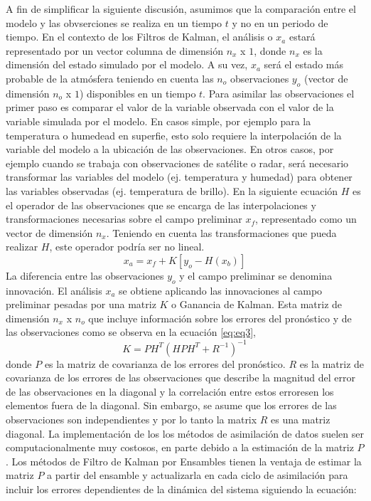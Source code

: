 \documentclass[12pt,oneside,a4paper]{reedthesis}
\begin{document}
A fin de simplificar la siguiente discusión, asumimos que la comparación entre el modelo y las obvserciones se realiza en un tiempo \(t\) y no en un periodo de tiempo. En el contexto de los Filtros de Kalman, el análisis o \(x_a\) estará representado por un vector columna de dimensión \(n_x\) x \(1\), donde \(n_x\) es la dimensión del estado simulado por el modelo. A su vez, \(x_a\) será el estado más probable de la atmósfera teniendo en cuenta las \(n_o\) observaciones \(y_o\) (vector de dimensión \(n_o\) x \(1\)) disponibles en un tiempo \(t\). Para asimilar las observaciones el primer paso es comparar el valor de la variable observada con el valor de la variable simulada por el modelo. En casos simple, por ejemplo para la temperatura o humedead en superfie, esto solo requiere la interpolación de la variable del modelo a la ubicación de las observaciones. En otros casos, por ejemplo cuando se trabaja con observaciones de satélite o radar, será necesario transformar las variables del modelo (ej. temperatura y humedad) para obtener las variables observadas (ej. temperatura de brillo). En la siguiente ecuación \(H\) es el operador de las observaciones que se encarga de las interpolaciones y transformaciones necesarias sobre el campo preliminar \(x_f\), representado como un vector de dimensión \(n_x\). Teniendo en cuenta las transformaciones que pueda realizar \(H\), este operador podría ser no lineal.
\begin{equation}
x_a = x_f + K[y_o - H(x_b )]
\label{eq:eq1}
\end{equation}
La diferencia entre las observaciones \(y_o\) y el campo preliminar se denomina innovación. El análisis \(x_a\) se obtiene aplicando las innovaciones al campo preliminar pesadas por una matriz \(K\) o Ganancia de Kalman. Esta matriz de dimensión \(n_x\) x \(n_o\) que incluye información sobre los errores del pronóstico y de las observaciones como se observa en la ecuación \eqref{eq:eq3},
\begin{equation}
K = PH^T (HPH^T + R^{-1})^{-1}
\label{eq:eq3}
\end{equation}
donde \(P\) es la matriz de covarianza de los errores del pronóstico. \(R\) es la matriz de covarianza de los errores de las observaciones que describe la magnitud del error de las observaciones en la diagonal y la correlación entre estos erroresen los elementos fuera de la diagonal. Sin embargo, se asume que los errores de las observaciones son independientes y por lo tanto la matrix \(R\) es una matriz diagonal. La implementación de los los métodos de asimilación de datos suelen ser computacionalmente muy costosos, en parte debido a la estimación de la matriz \(P\). Los métodos de Filtro de Kalman por Ensambles tienen la ventaja de estimar la matriz \(P\) a partir del ensamble y actualizarla en cada ciclo de asimilación para incluir los errores dependientes de la dinámica del sistema siguiendo la ecuación:
\end{document}
